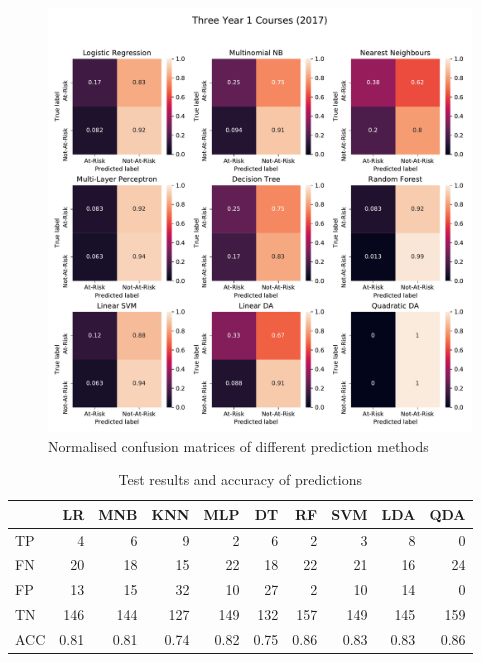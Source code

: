 \documentclass[a4paper]{report}
\begin{document}
\begin{figure}[H]
  \centering
  \includegraphics[width=\linewidth]{fig/ML_Y1Fs_bin_17.pdf}
  \caption{\label{fig:ML_Y1Fs_bin_17}Normalised confusion matrices of different prediction methods}
\end{figure}

\begin{table}[H]
  \centering
  \begin{tabular}{lrrrrrrrrr}
    \toprule
    {} &   LR &  MNB &  KNN &  MLP &   DT &   RF &  SVM &  LDA &  QDA \\
    \midrule
    TP  &    4 &    6 &    9 &    2 &    6 &    2 &    3 &    8 &    0 \\
    FN  &   20 &   18 &   15 &   22 &   18 &   22 &   21 &   16 &   24 \\
    FP  &   13 &   15 &   32 &   10 &   27 &    2 &   10 &   14 &    0 \\
    TN  &  146 &  144 &  127 &  149 &  132 &  157 &  149 &  145 &  159 \\
    ACC & 0.81 & 0.81 & 0.74 & 0.82 & 0.75 & 0.86 & 0.83 & 0.83 & 0.86 \\
    \bottomrule
  \end{tabular}
  \caption{\label{tab:ML_Y1Fs_bin_17}Test results and accuracy of predictions}
\end{table}
\end{document}
